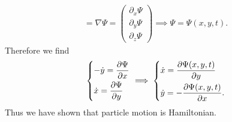 \begin{ex}
\begin{align}
 = \nabla \Psi =
 \begin{pmatrix}
 	\partial_x \Psi \\ \partial_y \Psi \\ \partial_z \Psi
 \end{pmatrix}
 \implies \Psi = \Psi(x,y,t).
\end{align}
Therefore we find
\begin{align}
	\begin{dcases}
		-\dot{y} = \frac{\partial \Psi}{\partial x} \\
		\dot{x} = \frac{\partial \Psi}{\partial y}
	\end{dcases}
	\implies 
	\begin{dcases}
		\dot{x} = \frac{\partial \Psi(x,y,t)}{\partial y} \\
	\dot{y} = -\frac{\partial \Psi(x,y,t)}{\partial x}.
	\end{dcases}
\end{align}
Thus we have shown that particle motion is Hamiltonian.
\end{ex}

